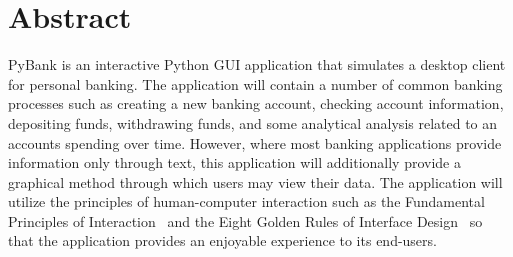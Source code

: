 \section{Abstract}
\label{sect:abstract}
PyBank is an interactive Python GUI application that simulates a desktop client for personal banking. The application will contain a number of common banking processes such as creating a new banking account, checking account information, depositing funds, withdrawing funds, and some analytical analysis related to an accounts spending over time. However, where most banking applications provide information only through text, this application will additionally provide a graphical method through which users may view their data. The application will utilize the principles of human-computer interaction such as the Fundamental Principles of Interaction~\cite{THE_DESIGN_OF_EVERYDAY_THINGS:1} and the Eight Golden Rules of Interface Design~\cite{DESIGNING_THE_USER_INTERFACE:2} so that the application provides an enjoyable experience to its end-users.

